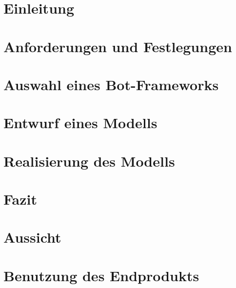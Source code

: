 \section{Einleitung}
\label{einleitung}


\clearpage
\section{Anforderungen und Festlegungen}
\label{anforderungen}


\clearpage
\section{Auswahl eines Bot-Frameworks}
\label{botframework}


\clearpage
\section{Entwurf eines Modells}


\clearpage
\section{Realisierung des Modells}



\clearpage
\section{Fazit}


\clearpage
\section{Aussicht}


\clearpage
\section{Benutzung des Endprodukts}


\nocite{GitHubGettingStartedHubot}
\nocite{BotkitBotkitToolkitbuilding}
\nocite{SlackConversationsAPI}
